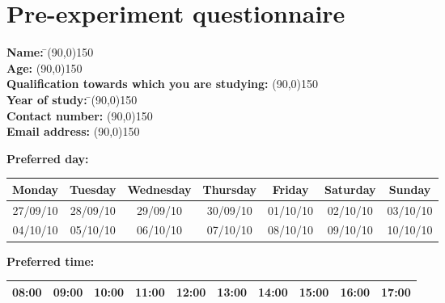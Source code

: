 \chapter{Pre-experiment questionnaire}
\label{sec:preEx}
\begin{tabbing}
{\bf Name:} \indent \= \line(90,0){150} \\ 
{\bf Age:} \> \line(90,0){150} \\
{\bf Qualification towards which you are studying:} \line(90,0){150} \\
{\bf Year of study:} \indent \= \line(90,0){150} \\
{\bf Contact number:} \> \line(90,0){150} \\
{\bf Email address:} \> \line(90,0){150} \\
\end{tabbing}

{\bf Preferred day:} \\
\begin{table}[h]

\begin{tabular}{| c | c| c| c | c | c | c |}

\hline	
 {\bf Monday} & {\bf Tuesday} & {\bf Wednesday} & {\bf Thursday} & {\bf Friday} & {\bf Saturday} & {\bf Sunday} \\
\hline  
27/09/10 & 28/09/10 & 29/09/10 & 30/09/10 & 01/10/10 & 02/10/10 & 03/10/10 \\
\hline
04/10/10 & 05/10/10 & 06/10/10 & 07/10/10 & 08/10/10 & 09/10/10 & 10/10/10 \\
\hline
\end{tabular}%

\end{table}

{\bf Preferred time:} \\
\begin{table}[h]

\begin{tabular}{| c | c| c| c | c | c | c | c| c|c|}

\hline	
 08:00 & 09:00 & 10:00 & 11:00 & 12:00 & 13:00 & 14:00 & 15:00 & 16:00 & 17:00 \\
\hline  

\end{tabular}%

\end{table}

